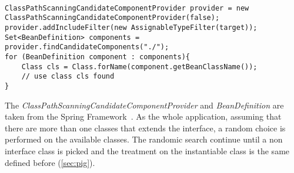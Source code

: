 \begin{lstlisting}[caption={how to find a sub-class of an interface},label={lst:interfaceMngmnt}]% Start your code-block

ClassPathScanningCandidateComponentProvider provider = new ClassPathScanningCandidateComponentProvider(false);
provider.addIncludeFilter(new AssignableTypeFilter(target));
Set<BeanDefinition> components = provider.findCandidateComponents("./");
for (BeanDefinition component : components){
	Class cls = Class.forName(component.getBeanClassName());
	// use class cls found
}
\end{lstlisting}
The \textit{ClassPathScanningCandidateComponentProvider} and \textit{BeanDefinition} are taken from the Spring Framework~\cite{springFramework}.
As the whole application, assuming that there are more than one classes that extends the interface, a random choice is performed on the available classes.
The randomic search continue until a non interface class is picked and the treatment on the instantiable class is the same defined before (\autoref{sec:pig}).

